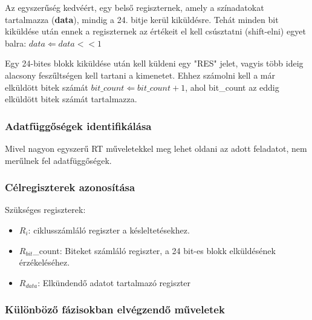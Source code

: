 \documentclass[10pt]{article} %
\begin{document}
\indent Az egyszerűség kedvéért, egy belső regiszternek, amely a színadatokat tartalmazza (\textbf{data}), mindig a 24. bitje kerül kiküldésre.
Tehát minden bit kiküldése után ennek a regiszternek az értékeit el kell csúsztatni (shift-elni) egyet balra: $data \Leftarrow data << 1$

\indent Egy 24-bites blokk kiküldése után kell küldeni egy "RES" jelet, vagyis több ideig alacsony feszűltségen kell tartani a kimenetet. 
Ehhez számolni kell a már elküldött bitek számát $bit\_count \Leftarrow bit\_count + 1$, ahol bit\_count az eddig elküldött bitek számát tartalmazza.

\subsubsection{Adatfüggőségek identifikálása}

Mivel nagyon egyszerű RT műveletekkel meg lehet oldani az adott feladatot, nem merűlnek fel adatfüggőségek.

\subsubsection{Célregiszterek azonosítása}

Szükséges regiszterek:
\begin{itemize}
	\item $R_i$: ciklusszámláló regiszter a késleltetésekhez.
	\item $R_{bit}$\_count: Biteket számláló regiszter, a 24 bit-es blokk elküldésének érzékeléséhez.
	\item $R_{data}$: Elkündendő adatot tartalmazó regiszter
\end{itemize}

\subsubsection{Különböző fázisokban elvégzendő műveletek}
\end{document}
